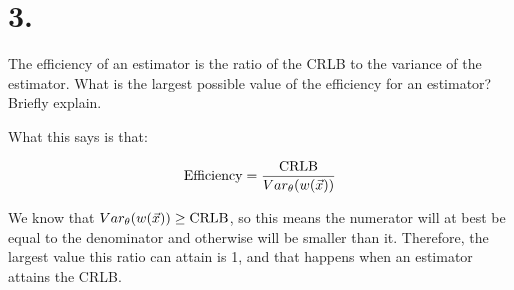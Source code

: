 \section{3.}

The efficiency of an estimator is the ratio of the CRLB to the variance of the estimator. What is the largest possible value of the efficiency for an estimator? Briefly explain.

What this says is that:

\[
	\text{Efficiency} = \frac{\text{CRLB}}{Var_{\theta}(w(\vec{x}))}
\]

We know that $Var_{\theta}(w(\vec{x})) \geq \text{CRLB}$, so this means the numerator will at best be equal to the denominator and otherwise will be smaller than it. Therefore, the largest value this ratio can attain is 1, and that happens when an estimator attains the CRLB.
